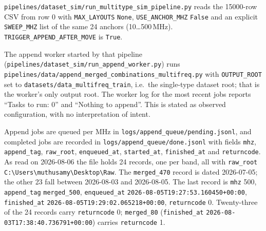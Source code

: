 \texttt{pipelines/\allowbreak{}dataset\_\allowbreak{}sim/\allowbreak{}run\_\allowbreak{}multitype\_\allowbreak{}sim\_\allowbreak{}pipeline.py} reads the 15000-row CSV from row 0
with \texttt{MAX\_LAYOUTS} \texttt{None}, \texttt{USE\_ANCHOR\_MHZ} \texttt{False} and an explicit
\texttt{SWEEP\_MHZ} list of the same 24 anchors (10\ldots500\,MHz). \texttt{TRIGGER\_APPEND\_AFTER\_MOVE}
is \texttt{True}.

The append worker started by that pipeline
(\texttt{pipelines/\allowbreak{}dataset\_\allowbreak{}sim/\allowbreak{}run\_\allowbreak{}append\_\allowbreak{}worker.py}) runs
\texttt{pipelines/\allowbreak{}data/\allowbreak{}append\_\allowbreak{}merged\_\allowbreak{}combinations\_\allowbreak{}multifreq.py} with \texttt{OUTPUT\_ROOT} set to
\texttt{datasets/data\_multifreq\_train}, i.e.\ the single-type dataset root; that is the worker's
only output root. The worker log for the most recent jobs reports ``Tasks to run: 0'' and ``Nothing
to append''. This is stated as observed configuration, with no interpretation of intent.

Append jobs are queued per MHz in \texttt{logs/append\_queue/pending.jsonl}, and completed jobs are
recorded in \texttt{logs/append\_queue/done.jsonl} with fields \texttt{mhz}, \texttt{append\_tag},
\texttt{raw\_root}, \texttt{enqueued\_at}, \texttt{started\_at}, \texttt{finished\_at} and
\texttt{returncode}. As read on 2026-08-06 the file holds 24 records, one per band, all with
\texttt{raw\_root}
\texttt{C:\textbackslash{}Users\textbackslash{}muthusamy\textbackslash{}Desktop\textbackslash{}Raw}.
The \texttt{merged\_470} record is dated 2026-07-05; the other 23 fall between 2026-08-03 and
2026-08-05. The last record is \texttt{mhz} 500, \texttt{append\_tag} \texttt{merged\_500},
\texttt{enqueued\_at} \texttt{2026-08-05T19:27:53.160450+00:00}, \texttt{finished\_at}
\texttt{2026-08-05T19:29:02.065218+00:00}, \texttt{returncode} 0. Twenty-three of the 24 records
carry \texttt{returncode} 0; \texttt{merged\_80} (\texttt{finished\_at}
\texttt{2026-08-03T17:38:40.736791+00:00}) carries \texttt{returncode} 1.

